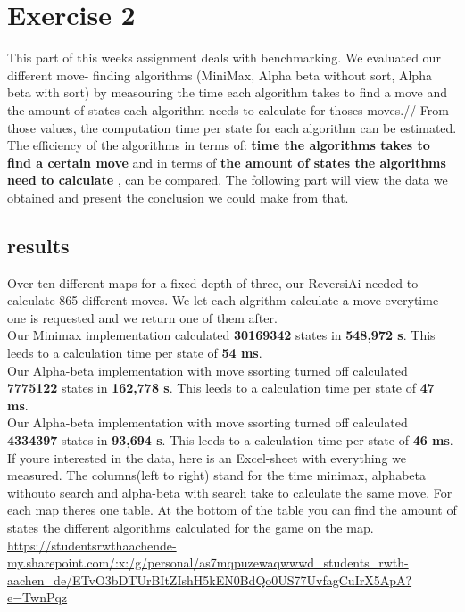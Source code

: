 \section{Exercise 2}
This part of this weeks assignment deals with benchmarking. We evaluated our different move- finding algorithms (MiniMax, Alpha beta without sort, Alpha beta with sort) by measouring the time each algorithm takes to find a move and the amount of states each algorithm needs to calculate for thoses moves.//
From those values, the computation time per state for each algorithm can be estimated.\\
The efficiency of the algorithms in terms of: \textbf{time the algorithms takes to find a certain move} and in terms of \textbf{the amount of states the algorithms need to calculate} , can be compared. The following part will view the data we obtained and present the conclusion we could make from that.
\subsection{results}
Over ten different maps for a fixed depth of three, our ReversiAi needed to calculate 865 different moves. We let each algrithm calculate a move everytime one is requested and we return one of them after.\\
Our Minimax implementation calculated \textbf{30169342} states in \textbf{548,972 s}. This leeds to a calculation time per state of \textbf{54 ms}.\\
Our Alpha-beta implementation with move ssorting turned off calculated \textbf{7775122} states in \textbf{162,778 s}. This leeds to a calculation time per state of \textbf{47
 ms}.\\
 Our Alpha-beta implementation with move ssorting turned off calculated \textbf{4334397
} states in \textbf{93,694 s}. This leeds to a calculation time per state of \textbf{46
ms}.
If youre interested in the data, here is an Excel-sheet with everything we measured. The columns(left to right) stand for the time minimax, alphabeta withouto search and alpha-beta with search take to calculate the same move. For each map theres one table. At the bottom of the table you can find the amount of states the different algorithms calculated for the game on the map.\\
\url{https://studentsrwthaachende-my.sharepoint.com/:x:/g/personal/as7mqpuzewaqwwwd_students_rwth-aachen_de/ETvO3bDTUrBItZIshH5kEN0BdQo0US77UvfagCuIrX5ApA?e=TwnPqz}
